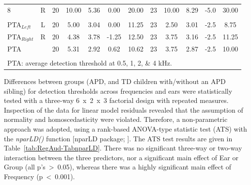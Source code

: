 \documentclass[a4paper, twoside]{templates/ociamthesis}
\begin{document}
\begin{table}
{\begin{tabular}[t]{lcccccc|>{}ccccc}
\hspace{1em}8 & R & 20 & 10.00 & 5.36 & 0.00 & 20.00 & 23 & 10.00 & 8.29 & -5.0 & 30.00\\
\addlinespace[0.3em]
\multicolumn{12}{l}{\textbf{PTAs}}\\
\hspace{1em}PTA$_{Left}$ & L & 20 & 5.00 & 3.04 & 0.00 & 11.25 & 23 & 2.50 & 3.01 & -2.5 & 8.75\\
\hspace{1em}PTA$_{Right}$ & R & 20 & 4.38 & 3.78 & -1.25 & 12.50 & 23 & 3.75 & 3.16 & -2.5 & 11.25\\
\hspace{1em}PTA &  & 20 & 5.31 & 2.92 & 0.62 & 10.62 & 23 & 3.75 & 2.87 & -2.5 & 10.00\\
\bottomrule
\multicolumn{12}{l}{\textsuperscript{} PTA: average detection threshold at 0.5, 1, 2, \& 4 kHz.}\\
\end{tabular}}
\end{table}

Differences between groups (APD, and TD children with/without an APD sibling) for detection thresholds across frequencies and ears were statistically tested with a three-way 6~x~2~x~3 factorial design with repeated measures. Inspection of the data for linear model residuals revealed that the assumption of normality and homoscedasticity were violated. Therefore, a non-parametric approach was adopted, using a rank-based ANOVA-type statistic test (ATS) with the \emph{nparLD()} function {[}nparLD package; \textcite{nparLDPackageR}{]}. The ATS test results are given in Table~\ref{tab:RegAud-TabnparLD}. There was no significant three-way or two-way interaction between the three predictors, nor a significant main effect of Ear or Group (all p's~\textgreater~0.05), whereas there was a highly significant main effect of Frequency (p~\textless~0.001).\\
\end{document}
